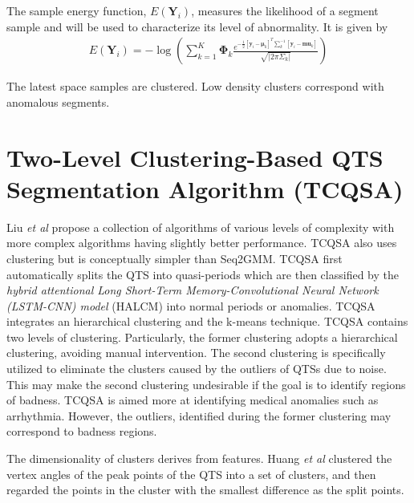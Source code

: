 \documentclass[twoside,twocolumn]{article}
\begin{document}
The sample energy function, $E(\boldsymbol{Y}_i)$, measures the likelihood of a segment sample and will be used to characterize its level of abnormality.  It is given by
\begin{eqnarray}
	E(\boldsymbol{Y}_i)=-\log\left(\sum_{k=1}^K\boldsymbol{\Phi}_k\frac{ e^{-\frac{1}{2}[\boldsymbol{y}_i-\boldsymbol{\mu}_k]^T\sum_k^{-1}[\boldsymbol{y}_i-\boldsymbol{mu}_k]} }{\sqrt{\vert 2\pi\Sigma_k\vert }}\right)
	\label{sampleEnergyFunction}
\end{eqnarray}

The latest space samples are clustered.  Low density clusters correspond with anomalous segments.

\section{Two-Level Clustering-Based QTS Segmentation Algorithm (TCQSA)}

Liu {\em et al}\cite{Liu2022} propose a collection of algorithms of various levels of complexity with more complex algorithms having slightly better performance.  TCQSA also uses clustering but is conceptually simpler than Seq2GMM.   TCQSA first automatically splits the QTS into quasi-periods which are then classified by the {\em hybrid attentional Long Short-Term Memory-Convolutional Neural Network (LSTM-CNN) model} (HALCM) into normal periods or anomalies.  TCQSA integrates an hierarchical clustering and the k-means technique.  TCQSA contains two levels of clustering. Particularly, the former clustering adopts a hierarchical clustering, avoiding manual intervention.  The second clustering is speciﬁcally utilized to eliminate the clusters caused by the outliers of QTSs due to noise.  This may make the second clustering undesirable if the goal is to identify regions of badness.  TCQSA is aimed more at identifying medical anomalies such as arrhythmia.  However, the outliers, identified during the former clustering may correspond to badness regions.

The dimensionality of clusters derives from features.  Huang {\em et al}\cite{Huang2014} clustered the vertex angles of the peak points of the QTS into a set of clusters, and then regarded the points in the cluster with the smallest difference as the split points.
\end{document}
